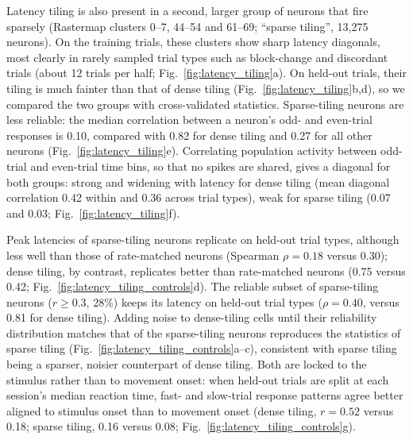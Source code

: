\documentclass[10pt,lineno]{elife}
\begin{document}
Latency tiling is also present in a second, larger group of neurons that fire sparsely (Rastermap clusters 0--7, 44--54 and 61--69; ``sparse tiling'', 13,275 neurons). On the training trials, these clusters show sharp latency diagonals, most clearly in rarely sampled trial types such as block-change and discordant trials (about 12 trials per half; Fig.~\ref{fig:latency_tiling}a). On held-out trials, their tiling is much fainter than that of dense tiling (Fig.~\ref{fig:latency_tiling}b,d), so we compared the two groups with cross-validated statistics. Sparse-tiling neurons are less reliable: the median correlation between a neuron's odd- and even-trial responses is 0.10, compared with 0.82 for dense tiling and 0.27 for all other neurons (Fig.~\ref{fig:latency_tiling}e). Correlating population activity between odd-trial and even-trial time bins, so that no spikes are shared, gives a diagonal for both groups: strong and widening with latency for dense tiling (mean diagonal correlation 0.42 within and 0.36 across trial types), weak for sparse tiling (0.07 and 0.03; Fig.~\ref{fig:latency_tiling}f).

Peak latencies of sparse-tiling neurons replicate on held-out trial types, although less well than those of rate-matched neurons (Spearman $\rho=0.18$ versus 0.30); dense tiling, by contrast, replicates better than rate-matched neurons (0.75 versus 0.42; Fig.~\ref{fig:latency_tiling_controls}d). The reliable subset of sparse-tiling neurons ($r\geq0.3$, 28\%) keeps its latency on held-out trial types ($\rho=0.40$, versus 0.81 for dense tiling). Adding noise to dense-tiling cells until their reliability distribution matches that of the sparse-tiling neurons reproduces the statistics of sparse tiling (Fig.~\ref{fig:latency_tiling_controls}a--c), consistent with sparse tiling being a sparser, noisier counterpart of dense tiling. Both are locked to the stimulus rather than to movement onset: when held-out trials are split at each session's median reaction time, fast- and slow-trial response patterns agree better aligned to stimulus onset than to movement onset (dense tiling, $r=0.52$ versus 0.18; sparse tiling, 0.16 versus 0.08; Fig.~\ref{fig:latency_tiling_controls}g).
\end{document}
